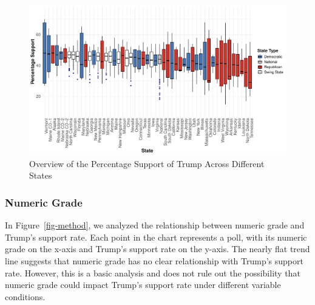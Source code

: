 \documentclass[
  letterpaper,
  DIV=11,
  numbers=noendperiod]{scrartcl}
\begin{document}
\begin{figure}

{\centering \includegraphics{Insights-and-Predictions-for-the-U.S.-Election_files/figure-pdf/fig-state-1.pdf}

}

\caption{\label{fig-state}Overview of the Percentage Support of Trump
Across Different States}

\end{figure}

\hypertarget{numeric-grade}{%
\subsubsection{Numeric Grade}\label{numeric-grade}}

In Figure~\ref{fig-method}, we analyzed the relationship between numeric
grade and Trump's support rate. Each point in the chart represents a
poll, with its numeric grade on the x-axis and Trump's support rate on
the y-axis. The nearly flat trend line suggests that numeric grade has
no clear relationship with Trump's support rate. However, this is a
basic analysis and does not rule out the possibility that numeric grade
could impact Trump's support rate under different variable conditions.
\end{document}
